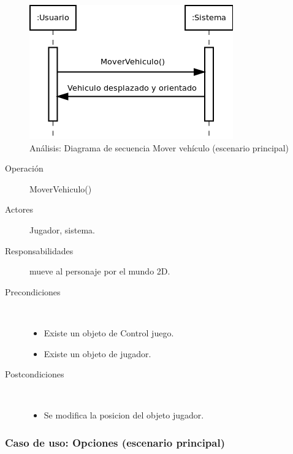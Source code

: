 \begin{figure}[H] 
  \label{secuencia_mover_vehiculo}
  \begin{center}
    \includegraphics[scale=0.6]{imagenes/analisis/secuencia_mover_vehiculo.png}
  \end{center}
  \caption{Análisis: Diagrama de secuencia Mover vehículo (escenario principal)}
\end{figure}

\begin{description}
    \item [Operación] MoverVehiculo()
    \item [Actores] Jugador, sistema.
    \item [Responsabilidades] mueve al personaje por el mundo 2D.
    \item [Precondiciones] $\quad$
        \begin{itemize}
            \item Existe un objeto de Control juego.
            \item Existe un objeto de jugador.        
        \end{itemize}
    \item [Postcondiciones] $\quad$
        \begin{itemize}
            \item Se modifica la posicion del objeto jugador.
        \end{itemize}
\end{description}

\subsubsection{Caso de uso: Opciones (escenario principal)}


